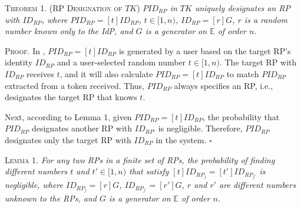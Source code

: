 \vspace{3mm}
\noindent\textsc{Theorem 1. (RP Designation of $TK$)} {\em $PID_{RP}$ in $TK$ uniquely designates an RP with $ID_{RP}$, where $PID_{RP}= [t]ID_{RP}$, $t \in [1,n)$, $ID_{RP} = [r]G$, $r$ is a random number known only to the IdP, and $G$ is a generator on $\mathbb{E}$ of order $n$.}

\vspace{0.75mm}
\noindent\textsc{Proof.} In \usso, $PID_{RP}=[t]ID_{RP}$ is generated by a user based on the target RP's identity $ID_{RP}$ and a user-selected random number $t \in [1,n)$.
The target RP with $ID_{RP}$ receives $t$,
     and it will also calculate $PID_{RP}=[t]ID_{RP}$ to match $PID_{RP}$ extracted from a token received.
Thus, $PID_{RP}$ always specifies an RP, i.e., %
designates the target RP that knows $t$.

Next, according to Lemma 1, given $PID_{RP} = [t]ID_{RP}$, the probability that $PID_{RP}$ designates another RP with $ID_{RP'}$ is negligible. %
Therefore, $PID_{RP}$ designates only the target RP with $ID_{RP}$ in the system.  \hfill $\square$

\vspace{3mm}
\noindent\textsc{Lemma 1.} {\em  For any two RPs in a finite set of RPs, the probability of finding different numbers $t$ and $t' \in [1,n)$ that satisfy $[t]ID_{RP_j} = [t']ID_{RP_{j'}}$ is negligible, where $ID_{RP_j}=[r]G$, $ID_{RP_{j'}}=[r']G$, $r$ and $r'$ are different numbers unknown to the RPs, and $G$ is a generator on $\mathbb{E}$ of order $n$.}


